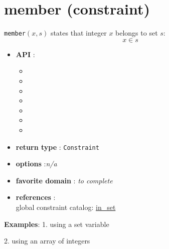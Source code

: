 \label{member}
\hypertarget{member}{}

\section{member (constraint)}\label{member:memberconstraint}\hypertarget{member:memberconstraint}{}

\begin{notedef}
  \texttt{member}$(x,s)$ states that integer $x$ belongs to set $s$:
$$x\in s$$
\end{notedef}

\begin{itemize}
	\item \textbf{API} :
	\begin{itemize}
		\item {}
		\item {}
		\item {}
		\item {}
		\item {}
		\item {}
		\item {}
	\end{itemize}
	\item \textbf{return type} : \texttt{Constraint}
	\item \textbf{options} :\emph{n/a}
	\item \textbf{favorite domain} : \emph{to complete}
	\item \textbf{references} :\\
      global constraint catalog: \href{http://www.emn.fr/x-info/sdemasse/gccat/Cin_set.html}{in\_set}
\end{itemize}

\textbf{Examples}:
1. using a set variable


2. using an array of integers

